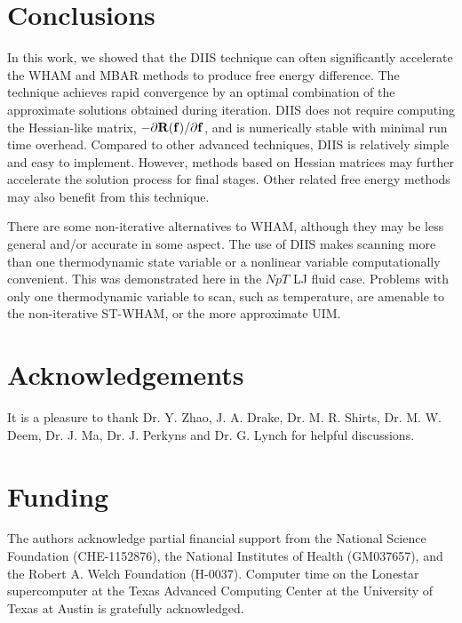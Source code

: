 \documentclass{gMOS2e}
\begin{document}
\section{Conclusions}



In this work, we showed that the DIIS technique
can often significantly accelerate
the WHAM and MBAR methods to produce free energy difference.
%
The technique achieves rapid convergence
by an optimal combination of the approximate
solutions obtained during iteration.
%
DIIS does not require computing
the Hessian-like matrix,
$-\partial \mathbf{R}(\mathbf{f})/\partial \mathbf{f}$,
and is numerically stable
with minimal run time overhead.
%
Compared to other advanced techniques\cite{
shirts2008, zhu2012},
DIIS is relatively simple and easy to implement.
However, methods based on Hessian matrices
may further accelerate the solution process
for final stages.
%
Other related free energy methods\cite{
shen1991, woolf1994, crouzy1994, roux1995}
may also benefit from this technique.
%



There are some non-iterative alternatives to WHAM,
although they may be less general and/or accurate
in some aspect.
%
The use of DIIS makes scanning more than one thermodynamic state variable
or a nonlinear variable
computationally convenient.
%
This was demonstrated here in the $NpT$ LJ fluid case.
%
Problems with only one thermodynamic variable to scan, such as temperature,
are amenable to the non-iterative ST-WHAM,
or the more approximate UIM.
%



\section*{Acknowledgements}





It is a pleasure to thank
Dr. Y. Zhao,
J. A. Drake,
Dr. M. R. Shirts,
Dr. M. W. Deem,
Dr. J. Ma,
Dr. J. Perkyns and Dr. G. Lynch
for helpful discussions.
%


\section*{Funding}


The authors acknowledge
partial financial support from
the National Science Foundation (CHE-1152876),
the National Institutes of Health (GM037657),
and
the Robert A. Welch Foundation (H-0037).
%
Computer time on the Lonestar supercomputer
at the Texas Advanced Computing Center
at the University of Texas at Austin
is gratefully acknowledged.
\end{document}
